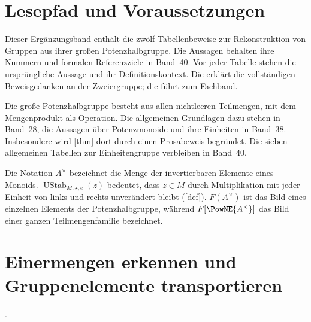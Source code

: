 \section*{Lesepfad und Voraussetzungen}
Dieser Ergänzungsband enthält die zwölf Tabellenbeweise zur Rekonstruktion
von Gruppen aus ihrer großen Potenzhalbgruppe. Die Aussagen behalten ihre
Nummern und formalen Referenzziele in Band~40. Vor jeder Tabelle stehen
die ursprüngliche Aussage und ihr Definitionskontext.
Die \ReconstructionReadingLink{} erklärt die vollständigen Beweisgedanken
an der Zweiergruppe; die \ReconstructionMainLink{} führt zum Fachband.

Die große Potenzhalbgruppe besteht aus allen nichtleeren Teilmengen,
mit dem Mengenprodukt als Operation. Die allgemeinen Grundlagen dazu
stehen in Band~28, die Aussagen über Potenzmonoide und ihre Einheiten
in Band~38. Insbesondere wird
[thm] dort durch einen
Prosabeweis begründet. Die sieben allgemeinen Tabellen zur
Einheitengruppe verbleiben in Band~40.

Die Notation \(A^\times\) bezeichnet die Menge der invertierbaren
Elemente eines Monoids. \(\operatorname{UStab}_{M,\star,e}(z)\)
bedeutet, dass \(z\in M\) durch Multiplikation mit jeder Einheit
von links und rechts unverändert bleibt
([def]).
\(F(A^\times)\) ist das Bild eines einzelnen Elements der
Potenzhalbgruppe, während \(F[\PowNE{A^\times}]\) das Bild einer
ganzen Teilmengenfamilie bezeichnet.

\par{}
\section*{Einermengen erkennen und Gruppenelemente transportieren}
\noindent{}.\par

